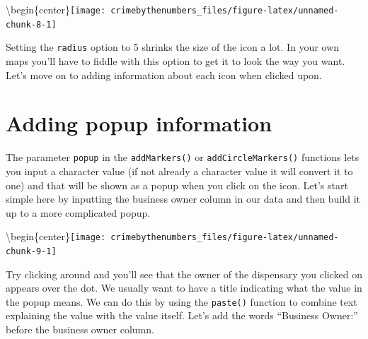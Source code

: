 \documentclass[
  12pt,
]{book}
\newenvironment{Shaded}{\begin{snugshade}}{\end{snugshade}}
\newcommand{\DataTypeTok}[1]{\textcolor[rgb]{0.27,0.27,0.27}{#1}}
\newcommand{\DecValTok}[1]{\textcolor[rgb]{0.06,0.06,0.06}{#1}}
\newcommand{\KeywordTok}[1]{\textcolor[rgb]{0.27,0.27,0.27}{\textbf{#1}}}
\newcommand{\NormalTok}[1]{#1}
\newcommand{\OperatorTok}[1]{\textcolor[rgb]{0.43,0.43,0.43}{\textbf{#1}}}
\newcommand{\StringTok}[1]{\textcolor[rgb]{0.5,0.5,0.5}{#1}}
\begin{document}
\textbackslash begin\{center\}\texttt{[image: crimebythenumbers\_files/figure-latex/unnamed-chunk-8-1]}

Setting the \texttt{radius} option to 5 shrinks the size of the icon a lot. In your own maps you'll have to fiddle with this option to get it to look the way you want. Let's move on to adding information about each icon when clicked upon.

\hypertarget{adding-popup-information}{%
\section{Adding popup information}\label{adding-popup-information}}

The parameter \texttt{popup} in the \texttt{addMarkers()} or \texttt{addCircleMarkers()} functions lets you input a character value (if not already a character value it will convert it to one) and that will be shown as a popup when you click on the icon. Let's start simple here by inputting the business owner column in our data and then build it up to a more complicated popup.

\begin{Shaded}
\end{Shaded}

\textbackslash begin\{center\}\texttt{[image: crimebythenumbers\_files/figure-latex/unnamed-chunk-9-1]}

Try clicking around and you'll see that the owner of the dispensary you clicked on appears over the dot. We usually want to have a title indicating what the value in the popup means. We can do this by using the \texttt{paste()} function to combine text explaining the value with the value itself. Let's add the words ``Business Owner:'' before the business owner column.
\end{document}
